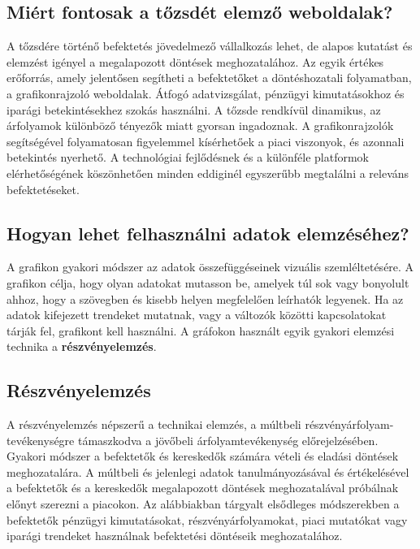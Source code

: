 \subsection {Miért fontosak a tőzsdét elemző weboldalak?}

A tőzsdére történő befektetés jövedelmező vállalkozás lehet, de alapos kutatást és elemzést igényel a megalapozott döntések meghozatalához. Az egyik értékes erőforrás, amely jelentősen segítheti a befektetőket a döntéshozatali folyamatban, a grafikonrajzoló weboldalak. Átfogó adatvizsgálat, pénzügyi kimutatásokhoz és iparági betekintésekhez szokás használni. A tőzsde rendkívül dinamikus, az árfolyamok különböző tényezők miatt gyorsan ingadoznak. A grafikonrajzolók segítségével folyamatosan figyelemmel kísérhetőek a piaci viszonyok, és azonnali betekintés nyerhető.
A technológiai fejlődésnek és a különféle platformok elérhetőségének köszönhetően minden eddiginél egyszerűbb megtalálni a releváns befektetéseket.

\subsection{Hogyan lehet felhasználni adatok elemzéséhez?}

A grafikon gyakori módszer az adatok összefüggéseinek vizuális szemléltetésére. A grafikon célja, hogy olyan adatokat mutasson be, amelyek túl sok vagy bonyolult ahhoz, hogy a szövegben és kisebb helyen megfelelően leírhatók legyenek. Ha az adatok kifejezett trendeket mutatnak, vagy a változók közötti kapcsolatokat tárják fel, grafikont kell használni. 
A gráfokon használt egyik gyakori elemzési technika a \textbf{részvényelemzés}.

\subsection{Részvényelemzés}

A részvényelemzés népszerű a technikai elemzés, a múltbeli részvényárfolyam-
tevékenységre támaszkodva a jövőbeli árfolyamtevékenység előrejelzésében. Gyakori módszer a befektetők és kereskedők számára vételi és eladási döntések meghozatalára. A múltbeli és jelenlegi adatok tanulmányozásával és értékelésével a befektetők és a kereskedők megalapozott döntések meghozatalával próbálnak előnyt szerezni a piacokon. Az alábbiakban tárgyalt elsődleges módszerekben a befektetők pénzügyi kimutatásokat, részvényárfolyamokat, piaci mutatókat vagy iparági trendeket használnak befektetési döntéseik meghozatalához. \cite{investo}
